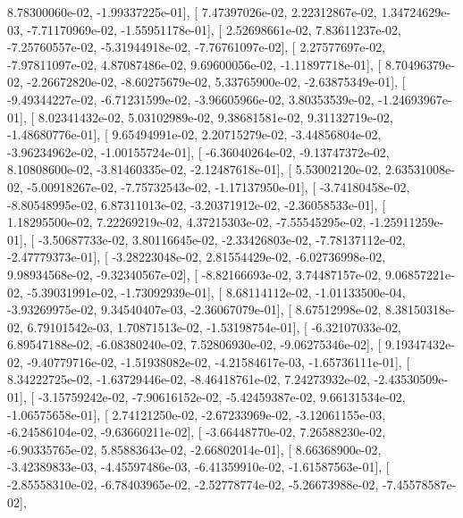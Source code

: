 \documentclass{article}
\begin{document}
          8.78300060e-02,  -1.99337225e-01],
       [  7.47397026e-02,   2.22312867e-02,   1.34724629e-03,
         -7.71170969e-02,  -1.55951178e-01],
       [  2.52698661e-02,   7.83611237e-02,  -7.25760557e-02,
         -5.31944918e-02,  -7.76761097e-02],
       [  2.27577697e-02,  -7.97811097e-02,   4.87087486e-02,
          9.69600056e-02,  -1.11897718e-01],
       [  8.70496379e-02,  -2.26672820e-02,  -8.60275679e-02,
          5.33765900e-02,  -2.63875349e-01],
       [ -9.49344227e-02,  -6.71231599e-02,  -3.96605966e-02,
          3.80353539e-02,  -1.24693967e-01],
       [  8.02341432e-02,   5.03102989e-02,   9.38681581e-02,
          9.31132719e-02,  -1.48680776e-01],
       [  9.65494991e-02,   2.20715279e-02,  -3.44856804e-02,
         -3.96234962e-02,  -1.00155724e-01],
       [ -6.36040264e-02,  -9.13747372e-02,   8.10808600e-02,
         -3.81460335e-02,  -2.12487618e-01],
       [  5.53002120e-02,   2.63531008e-02,  -5.00918267e-02,
         -7.75732543e-02,  -1.17137950e-01],
       [ -3.74180458e-02,  -8.80548995e-02,   6.87311013e-02,
         -3.20371912e-02,  -2.36058533e-01],
       [  1.18295500e-02,   7.22269219e-02,   4.37215303e-02,
         -7.55545295e-02,  -1.25911259e-01],
       [ -3.50687733e-02,   3.80116645e-02,  -2.33426803e-02,
         -7.78137112e-02,  -2.47779373e-01],
       [ -3.28223048e-02,   2.81554429e-02,  -6.02736998e-02,
          9.98934568e-02,  -9.32340567e-02],
       [ -8.82166693e-02,   3.74487157e-02,   9.06857221e-02,
         -5.39031991e-02,  -1.73092939e-01],
       [  8.68114112e-02,  -1.01133500e-04,  -3.93269975e-02,
          9.34540407e-03,  -2.36067079e-01],
       [  8.67512998e-02,   8.38150318e-02,   6.79101542e-03,
          1.70871513e-02,  -1.53198754e-01],
       [ -6.32107033e-02,   6.89547188e-02,  -6.08380240e-02,
          7.52806930e-02,  -9.06275346e-02],
       [  9.19347432e-02,  -9.40779716e-02,  -1.51938082e-02,
         -4.21584617e-03,  -1.65736111e-01],
       [  8.34222725e-02,  -1.63729446e-02,  -8.46418761e-02,
          7.24273932e-02,  -2.43530509e-01],
       [ -3.15759242e-02,  -7.90616152e-02,  -5.42459387e-02,
          9.66131534e-02,  -1.06575658e-01],
       [  2.74121250e-02,  -2.67233969e-02,  -3.12061155e-03,
         -6.24586104e-02,  -9.63660211e-02],
       [ -3.66448770e-02,   7.26588230e-02,  -6.90335765e-02,
          5.85883643e-02,  -2.66802014e-01],
       [  8.66368900e-02,  -3.42389833e-03,  -4.45597486e-03,
         -6.41359910e-02,  -1.61587563e-01],
       [ -2.85558310e-02,  -6.78403965e-02,  -2.52778774e-02,
         -5.26673988e-02,  -7.45578587e-02],
\end{document}
